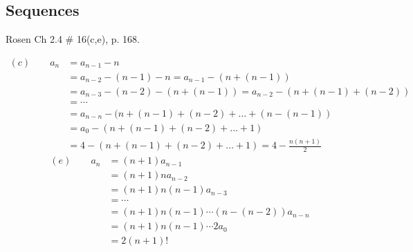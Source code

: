 \begin{questions}



\section*{Sequences} 

 Rosen Ch 2.4 \# 16(c,e), p. 168.
    \ifprintanswers
        \vspace{-10pt}
   \fi
\begin{solution}
        \vspace{-0.1in} 
        \begin{align*}
            (c) \quad \quad a_n &= a_{n-1} - n \\
            &= a_{n-2} -(n-1) - n = a_{n-1} - (n + (n-1)) \\
            &= a_{n-3} -(n-2) - (n + (n-1)) = a_{n-2} - (n + (n-1) + (n-2)) \\
            &= \cdots \\
            &= a_{n-n} -(n + (n-1) + (n-2) + \ldots + (n- (n-1)) \\
            &= a_0 - (n + (n-1) + (n-2) + \ldots + 1) \\
            &= 4 - (n + (n-1) + (n-2) + \ldots + 1) = 4 -\frac{n(n+1)}{2}
        \end{align*}
        \vspace{-0.1in}
        \begin{align*}
            (e) \quad \quad a_n &= (n+1)a_{n-1} \\
              &= (n+1)na_{n-2} \\
              &= (n+1)n(n-1)a_{n-3} \\
              &= \cdots \\
              &= (n+1)n(n-1)\cdots(n-(n-2))a_{n-n} \\
              &= (n+1)n(n-1)\cdots2a_{0} \\
              &= 2(n+1)!
        \end{align*}
\end{solution}



\end{questions}
